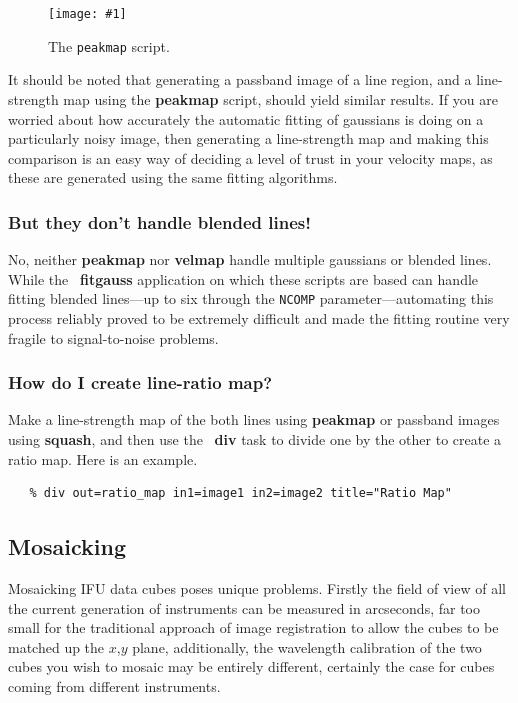 \documentclass[twoside,11pt]{article}
\newcommand{\htmladdimg}[1]{}
\newcommand{\htmlref}[2]{#1}
\newcommand{\xref}[3]{#1}
\newcommand{\xlabel}[1]{}
\newcommand{\myfig} [5] {
  \begin{figure}[thb]
    \centering\texttt{[image: \#1]}
    \typeout{#1 inserted on page \arabic{page}}
    \caption{\label{#4}#5}
  \end{figure}
  }
\newcommand{\myfig}[5]{
    \label{#4} \htmladdimg{#3}\\
    Figure: #5\\
    }
\begin{document}
{\myfig{sc16_peakmap.eps}{height=0.5\textheight}{sc16_peakmap.gif}{sc16_peakmap_fig}{The {\tt peakmap} script.}

It should be noted that generating a \xref{passband
image}{sun237}{passband} of a line region, and a line-strength map
using the {\bf peakmap} script, should yield similar results.  If you
are worried about how accurately the automatic fitting of gaussians is
doing on a particularly noisy image, then generating a line-strength
map and making this comparison is an easy way of deciding a level of
trust in your \htmlref{velocity maps}{sc16_velmap}, as these are
generated using the same fitting algorithms.

\subsubsection{But they don't handle blended lines!}

No, neither \xref{{\bf peakmap}}{sun237}{peakmap} nor \xref{{\bf
velmap}}{sun237}{velmap} handle multiple gaussians or blended lines.
While the \FIGARO\ \xref{{\bf fitgauss}}{sun86}{FITGAUSS} application on
which these scripts are based can handle fitting blended lines---up to
six through the {\tt NCOMP} parameter---automating this process reliably
proved to be extremely difficult and made the fitting routine very
fragile to signal-to-noise problems.

\subsubsection{How do I create line-ratio map?}

Make a line-strength map of the both lines using \xref{{\bf
peakmap}}{sun237}{peakmap} or passband images using \xref{{\bf
squash}}{sun237}{squash}, and then use the \KAPPA\ 
\xref{{\bf div}}{sun95}{DIV} task to divide one by the other to create a
ratio map.  Here is an example.

\small\begin{verbatim}
   % div out=ratio_map in1=image1 in2=image2 title="Ratio Map"
\end{verbatim}\normalsize

\subsection{\xlabel{sc16_mos}Mosaicking\label{sc16_mos}}

Mosaicking IFU data cubes poses unique problems.  Firstly the
field of view of all the current generation of instruments can be
measured in arcseconds, far too small for the traditional approach of
image registration to allow the cubes to be matched up the $x$,$y$
plane, additionally, the wavelength calibration of the two cubes you
wish to mosaic may be entirely different, certainly the case for cubes
coming from different instruments.

}
\end{document}
